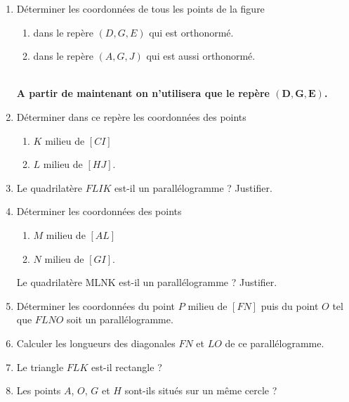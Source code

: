 \begin{enumerate}
	\item Déterminer les coordonnées de tous les points de la figure
	\begin{enumerate}
		\item dans le repère $(D, G, E)$ qui est orthonormé.
		\item dans le repère $(A, G, J)$ qui est aussi orthonormé.
	\end{enumerate}
~\\
\textbf{A partir de maintenant on n’utilisera que le repère $\mathbf{\left(D, G, E\right)}$.}

	\item Déterminer dans ce repère les coordonnées des points
	\begin{enumerate}
		\item $K$ milieu de $\left[CI\right]$
		\item $L$ milieu de $\left[HJ\right]$.
	\end{enumerate}

	\item Le quadrilatère $FLIK$ est-il un parallélogramme ? Justifier.

	\item Déterminer les coordonnées des points
	\begin{enumerate}
		\item $M$ milieu de $\left[AL\right]$
		\item $N$ milieu de $\left[GI\right]$.
	\end{enumerate}
	Le quadrilatère MLNK est-il un parallélogramme ? Justifier.
	\item Déterminer les coordonnées du point $P$ milieu de $\left[FN\right]$ puis du point $O$ tel que $FLNO$ soit un parallélogramme.
	\item Calculer les longueurs des diagonales $FN$ et $LO$ de ce parallélogramme.
	\item Le triangle $FLK$ est-il rectangle ?
	\item Les points $A$, $O$, $G$ et $H$ sont-ils situés sur un même cercle ?
\end{enumerate}


\exercice

